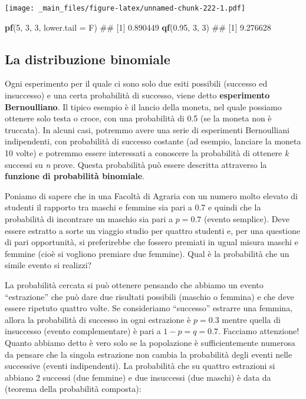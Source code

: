 \documentclass[a4paper,12pt,oneside]{book}
\newenvironment{Shaded}{\begin{snugshade}}{\end{snugshade}}
\newcommand{\KeywordTok}[1]{\textcolor[rgb]{0.13,0.29,0.53}{\textbf{#1}}}
\newcommand{\DataTypeTok}[1]{\textcolor[rgb]{0.13,0.29,0.53}{#1}}
\newcommand{\DecValTok}[1]{\textcolor[rgb]{0.00,0.00,0.81}{#1}}
\newcommand{\FloatTok}[1]{\textcolor[rgb]{0.00,0.00,0.81}{#1}}
\newcommand{\NormalTok}[1]{#1}
\theoremstyle{definition}
\theoremstyle{definition}
\theoremstyle{definition}
\theoremstyle{remark}
\begin{document}
\texttt{[image: \_main\_files/figure-latex/unnamed-chunk-222-1.pdf]}

\begin{Shaded}
\begin{Highlighting}[]
\KeywordTok{pf}\NormalTok{(}\DecValTok{5}\NormalTok{, }\DecValTok{3}\NormalTok{, }\DecValTok{3}\NormalTok{, }\DataTypeTok{lower.tail =}\NormalTok{ F)}
\NormalTok{## [1] 0.890449}
\KeywordTok{qf}\NormalTok{(}\FloatTok{0.95}\NormalTok{, }\DecValTok{3}\NormalTok{, }\DecValTok{3}\NormalTok{)}
\NormalTok{## [1] 9.276628}
\end{Highlighting}
\end{Shaded}

\subsection{La distribuzione
binomiale}\label{la-distribuzione-binomiale}

Ogni esperimento per il quale ci sono solo due esiti possibili (successo
ed insuccesso) e una certa probabilità di successo, viene detto
\textbf{esperimento Bernoulliano}. Il tipico esempio è il lancio della
moneta, nel quale possiamo ottenere solo testa o croce, con una
probabilità di 0.5 (se la moneta non è truccata). In alcuni casi,
potremmo avere una serie di esperimenti Bernoulliani indipendenti, con
probabilità di successo costante (ad esempio, lanciare la moneta 10
volte) e potremmo essere interessati a conoscere la probabilità di
ottenere \emph{k} successi su \emph{n} prove. Questa probabilità può
essere descritta attraverso la \textbf{funzione di probabilità
binomiale}.

Poniamo di sapere che in una Facoltà di Agraria con un numero molto
elevato di studenti il rapporto tra maschi e femmine sia pari a 0.7 e
quindi che la probabilità di incontrare un maschio sia pari a
\(p = 0.7\) (evento semplice). Deve essere estratto a sorte un viaggio
studio per quattro studenti e, per una questione di pari opportunità, si
preferirebbe che fossero premiati in ugual misura maschi e femmine (cioè
si vogliono premiare due femmine). Qual è la probabilità che un simile
evento si realizzi?

La probabilità cercata si può ottenere pensando che abbiamo un evento
``estrazione'' che può dare due risultati possibili (maschio o femmina)
e che deve essere ripetuto quattro volte. Se consideriamo ``successo''
estrarre una femmina, allora la probabilità di successo in ogni
estrazione è \(p = 0.3\) mentre quella di insuccesso (evento
complementare) è pari a \(1 - p = q = 0.7\). Facciamo attenzione! Quanto
abbiamo detto è vero solo se la popolazione è sufficientemente numerosa
da pensare che la singola estrazione non cambia la probabilità degli
eventi nelle successive (eventi indipendenti). La probabilità che su
quattro estrazioni si abbiano 2 successi (due femmine) e due insuccessi
(due maschi) è data da (teorema della probabilità composta):
\end{document}
